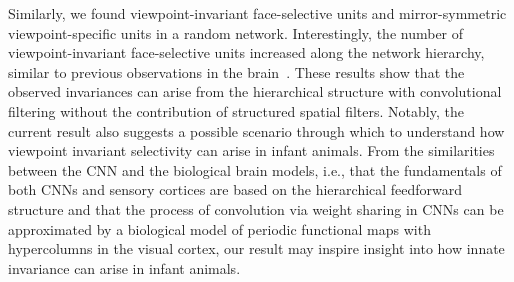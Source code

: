 \documentclass[sn-mathphys]{sn-jnl}%
\theoremstyle{thmstyleone}%
\theoremstyle{thmstyletwo}%
\theoremstyle{thmstylethree}%
\begin{document}
Similarly, we found viewpoint-invariant face-selective units and mirror-symmetric viewpoint-specific units in a random network.
Interestingly, the number of viewpoint-invariant face-selective units increased along the network hierarchy, similar to previous observations in the brain~\cite{freiwald2010functional}.
These results show that the observed invariances can arise from the hierarchical structure with convolutional filtering without the contribution of structured spatial filters.
Notably, the current result also suggests a possible scenario through which to understand how viewpoint invariant selectivity can arise in infant animals.
From the similarities between the CNN and the biological brain models, i.e., that the fundamentals of both CNNs and sensory cortices are based on the hierarchical feedforward structure and that the process of convolution via weight sharing in CNNs can be approximated by a biological model of periodic functional maps with hypercolumns in the visual cortex,
our result may inspire insight into how innate invariance can arise in infant animals.
\end{document}
